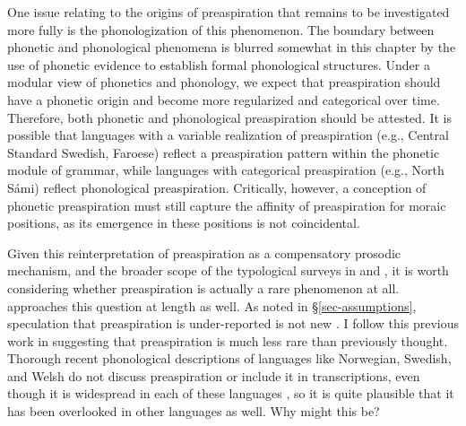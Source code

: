 \documentclass[output=paper,colorlinks,citecolor=brown]{langscibook}
\begin{document}
One issue relating to the origins of preaspiration that remains to be investigated more fully is the phonologization of this phenomenon. The boundary between phonetic and phonological phenomena is blurred somewhat in this chapter by the use of phonetic evidence to establish formal phonological structures. Under a modular view of phonetics and phonology, we expect that preaspiration should have a phonetic origin and become more regularized and categorical over time. Therefore, both phonetic and phonological preaspiration should be attested. It is possible that languages with a variable realization of preaspiration (e.g., Central Standard Swedish, Faroese) reflect a preaspiration pattern within the phonetic module of grammar, while languages with categorical preaspiration (e.g., North Sámi) reflect phonological preaspiration. Critically, however, a conception of phonetic preaspiration must still capture the affinity of preaspiration for moraic positions, as its emergence in these positions is not coincidental.

Given this reinterpretation of preaspiration as a compensatory prosodic mechanism, and the broader scope of the typological surveys in \citet{craioveanu-thesis} and , it is worth considering whether preaspiration is actually a rare phenomenon at all.  approaches this question at length as well. As noted in \S\ref{sec-assumptions}, speculation that preaspiration is under-reported is not new \citep{nichasaide1985,hejna2015,hejna2019,iosad2017-mfm,iosad2018}. I follow this previous work in suggesting that preaspiration is much less rare than previously thought. Thorough recent phonological descriptions of languages like Norwegian, Swedish, and Welsh do not discuss preaspiration or include it in transcriptions, even though it is widespread in each of these languages \citep{kristoffersen2000,riad2014,hannahs2013}, so it is quite plausible that it has been overlooked in other languages as well. Why might this be? 
\end{document}
